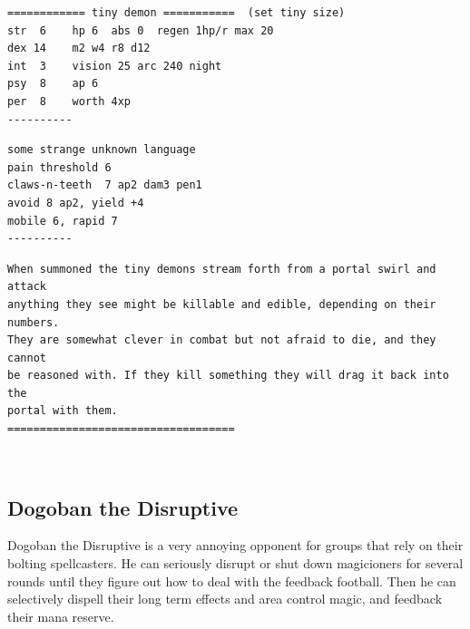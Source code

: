 \goodbreak \small \begin{samepage} \begin{verbatim}
============ tiny demon ===========  (set tiny size)
str  6    hp 6  abs 0  regen 1hp/r max 20
dex 14    m2 w4 r8 d12
int  3    vision 25 arc 240 night
psy  8    ap 6
per  8    worth 4xp
----------
\end{verbatim} \end{samepage} \goodbreak \begin{samepage} \begin{verbatim}
some strange unknown language
pain threshold 6
claws-n-teeth  7 ap2 dam3 pen1
avoid 8 ap2, yield +4
mobile 6, rapid 7
----------
\end{verbatim} \end{samepage} \goodbreak \begin{samepage} \begin{verbatim}
When summoned the tiny demons stream forth from a portal swirl and attack
anything they see might be killable and edible, depending on their numbers.
They are somewhat clever in combat but not afraid to die, and they cannot
be reasoned with. If they kill something they will drag it back into the
portal with them.
===================================
\end{verbatim} \end{samepage} \normalsize

\


\goodbreak
\subsection*{Dogoban the Disruptive}
\label{dogobanthedisruptive}

Dogoban the Disruptive is a very annoying opponent for groups that rely on their bolting spellcasters. He can seriously disrupt or shut down magicioners for several rounds until they figure out how to deal with the feedback football. Then he can selectively dispell their long term effects and area control magic, and feedback their mana reserve.

\

